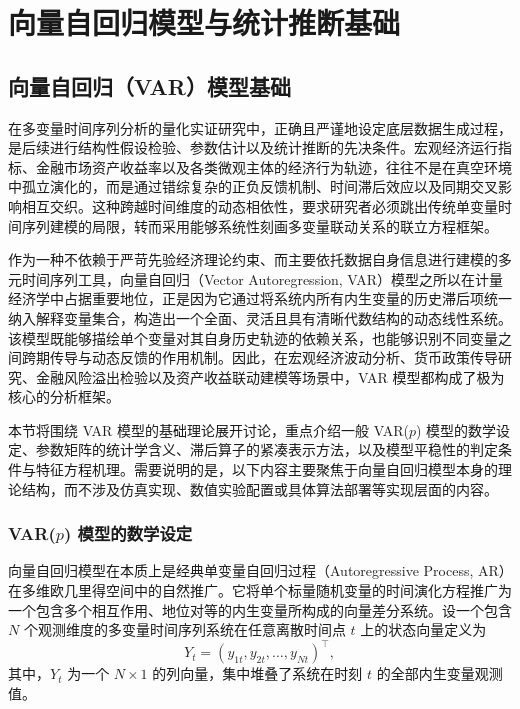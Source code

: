 \chapter{向量自回归模型与统计推断基础}

\section{向量自回归（VAR）模型基础}

在多变量时间序列分析的量化实证研究中，正确且严谨地设定底层数据生成过程，是后续进行结构性假设检验、参数估计以及统计推断的先决条件。宏观经济运行指标、金融市场资产收益率以及各类微观主体的经济行为轨迹，往往不是在真空环境中孤立演化的，而是通过错综复杂的正负反馈机制、时间滞后效应以及同期交叉影响相互交织。这种跨越时间维度的动态相依性，要求研究者必须跳出传统单变量时间序列建模的局限，转而采用能够系统性刻画多变量联动关系的联立方程框架。

作为一种不依赖于严苛先验经济理论约束、而主要依托数据自身信息进行建模的多元时间序列工具，向量自回归（Vector Autoregression, VAR）模型之所以在计量经济学中占据重要地位，正是因为它通过将系统内所有内生变量的历史滞后项统一纳入解释变量集合，构造出一个全面、灵活且具有清晰代数结构的动态线性系统。该模型既能够描绘单个变量对其自身历史轨迹的依赖关系，也能够识别不同变量之间跨期传导与动态反馈的作用机制。因此，在宏观经济波动分析、货币政策传导研究、金融风险溢出检验以及资产收益联动建模等场景中，VAR 模型都构成了极为核心的分析框架。

本节将围绕 VAR 模型的基础理论展开讨论，重点介绍一般 VAR($p$) 模型的数学设定、参数矩阵的统计学含义、滞后算子的紧凑表示方法，以及模型平稳性的判定条件与特征方程机理。需要说明的是，以下内容主要聚焦于向量自回归模型本身的理论结构，而不涉及仿真实现、数值实验配置或具体算法部署等实现层面的内容。

\subsection{\texorpdfstring{VAR($p$)}{VAR(p)} 模型的数学设定}

向量自回归模型在本质上是经典单变量自回归过程（Autoregressive Process, AR）在多维欧几里得空间中的自然推广。它将单个标量随机变量的时间演化方程推广为一个包含多个相互作用、地位对等的内生变量所构成的向量差分系统。设一个包含 $N$ 个观测维度的多变量时间序列系统在任意离散时间点 $t$ 上的状态向量定义为
\begin{equation}
Y_t=(y_{1t},y_{2t},\dots,y_{Nt})^\top,
\end{equation}
其中，$Y_t$ 为一个 $N\times 1$ 的列向量，集中堆叠了系统在时刻 $t$ 的全部内生变量观测值。

